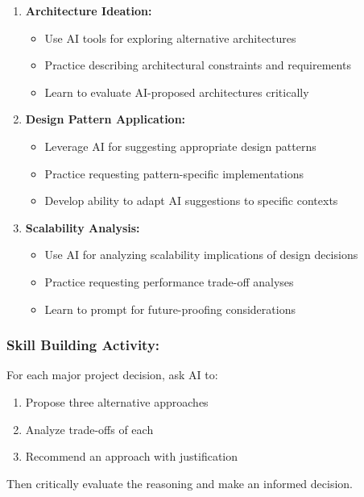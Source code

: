 \documentclass[12pt,a4paper]{article}
\begin{document}
\begin{enumerate}
    \item \textbf{Architecture Ideation:}
    \begin{itemize}
        \item Use AI tools for exploring alternative architectures
        \item Practice describing architectural constraints and requirements
        \item Learn to evaluate AI-proposed architectures critically
    \end{itemize}
    
    \item \textbf{Design Pattern Application:}
    \begin{itemize}
        \item Leverage AI for suggesting appropriate design patterns
        \item Practice requesting pattern-specific implementations
        \item Develop ability to adapt AI suggestions to specific contexts
    \end{itemize}
    
    \item \textbf{Scalability Analysis:}
    \begin{itemize}
        \item Use AI for analyzing scalability implications of design decisions
        \item Practice requesting performance trade-off analyses
        \item Learn to prompt for future-proofing considerations
    \end{itemize}
\end{enumerate}

\subsubsection*{Skill Building Activity:}

For each major project decision, ask AI to:
\begin{enumerate}
    \item Propose three alternative approaches
    \item Analyze trade-offs of each
    \item Recommend an approach with justification
\end{enumerate}
Then critically evaluate the reasoning and make an informed decision.
\end{document}

